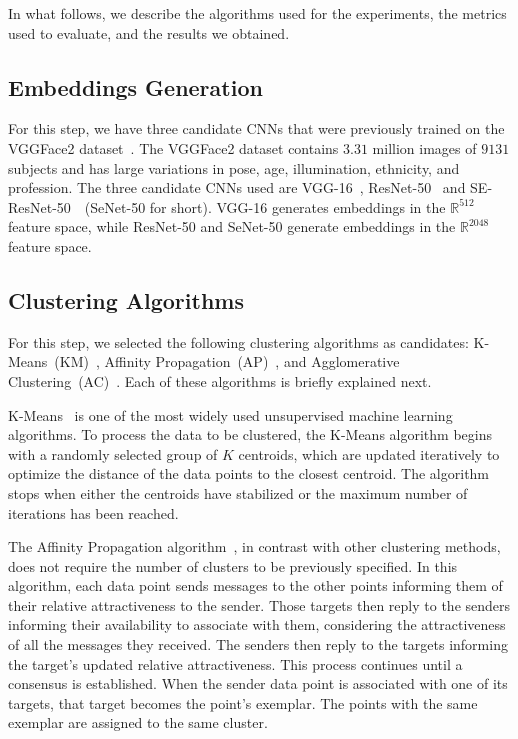 In what follows, we describe the algorithms used for the experiments, the metrics used to evaluate, and the results we obtained.

\subsection{Embeddings Generation}

For this step, we have three candidate CNNs that were previously trained on the VGGFace2 dataset~\cite{cao2018vggface2}. 
The VGGFace2 dataset contains $3.31$ million images of $9131$ subjects and has large variations in pose, age, illumination, ethnicity, and profession.
The three candidate CNNs used are VGG-16~\cite{vgg16}, ResNet-50~\cite{resnet} and SE-ResNet-50~\cite{senet}~(SeNet-50 for short). VGG-16 generates embeddings in the $\mathbb{R}^{512}$  feature space, while ResNet-50 and SeNet-50 generate embeddings in the $\mathbb{R}^{2048}$ feature space. 


\subsection{Clustering Algorithms}
For this step, we selected the following clustering algorithms as candidates: K-Means~(KM)~\cite{lloyd1982least}, Affinity Propagation~(AP)~\cite{frey2007clustering}, and Agglomerative Clustering~(AC)~\cite{ward1963hierarchical}. Each of these algorithms is briefly explained next.

K-Means~\cite{lloyd1982least} is one of the most widely used unsupervised machine learning algorithms. 
To process the data to be clustered, the K-Means algorithm begins with a randomly selected group of $K$ centroids, which are updated iteratively to optimize the distance of the data points to the closest centroid.
The algorithm stops when either the centroids have stabilized or the maximum number of iterations has been reached.

The Affinity Propagation algorithm~\cite{frey2007clustering}, in contrast with other clustering methods, does not require the number of clusters to be previously specified.
In this algorithm, each data point sends messages to the other points informing them of their relative attractiveness to the sender. 
Those targets then reply to the senders informing their availability to associate with them, considering the attractiveness of all the messages they received.
The senders then reply to the targets informing the target's updated relative attractiveness.
This process continues until a consensus is established.
When the sender data point is associated with one of its targets, that target becomes the point's exemplar.
The points with the same exemplar are assigned to the same cluster.


